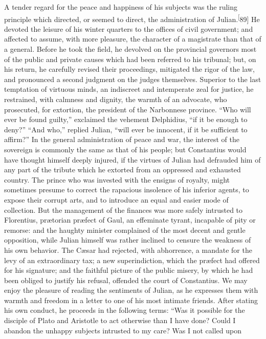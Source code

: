 A tender regard for the peace and happiness of his subjects was
the ruling principle which directed, or seemed to direct, the
administration of Julian.\textsuperscript[89] He devoted the leisure of his winter
quarters to the offices of civil government; and affected to
assume, with more pleasure, the character of a magistrate than
that of a general. Before he took the field, he devolved on the
provincial governors most of the public and private causes which
had been referred to his tribunal; but, on his return, he
carefully revised their proceedings, mitigated the rigor of the
law, and pronounced a second judgment on the judges themselves.
Superior to the last temptation of virtuous minds, an indiscreet
and intemperate zeal for justice, he restrained, with calmness
and dignity, the warmth of an advocate, who prosecuted, for
extortion, the president of the Narbonnese province. “Who will
ever be found guilty,” exclaimed the vehement Delphidius, “if it
be enough to deny?” “And who,” replied Julian, “will ever be
innocent, if it be sufficient to affirm?” In the general
administration of peace and war, the interest of the sovereign is
commonly the same as that of his people; but Constantius would
have thought himself deeply injured, if the virtues of Julian had
defrauded him of any part of the tribute which he extorted from
an oppressed and exhausted country. The prince who was invested
with the ensigns of royalty, might sometimes presume to correct
the rapacious insolence of his inferior agents, to expose their
corrupt arts, and to introduce an equal and easier mode of
collection. But the management of the finances was more safely
intrusted to Florentius, prætorian præfect of Gaul, an effeminate
tyrant, incapable of pity or remorse: and the haughty minister
complained of the most decent and gentle opposition, while Julian
himself was rather inclined to censure the weakness of his own
behavior. The Cæsar had rejected, with abhorrence, a mandate for
the levy of an extraordinary tax; a new superindiction, which the
præfect had offered for his signature; and the faithful picture
of the public misery, by which he had been obliged to justify his
refusal, offended the court of Constantius. We may enjoy the
pleasure of reading the sentiments of Julian, as he expresses
them with warmth and freedom in a letter to one of his most
intimate friends. After stating his own conduct, he proceeds in
the following terms: “Was it possible for the disciple of Plato
and Aristotle to act otherwise than I have done? Could I abandon
the unhappy subjects intrusted to my care? Was I not called upon
